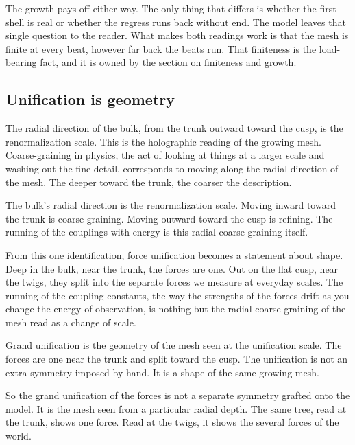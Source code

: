 The growth pays off either way. The only thing that differs is whether the first shell is real or whether the regress runs back without end. The model leaves that single question to the reader. What makes both readings work is that the mesh is finite at every beat, however far back the beats run. That finiteness is the load-bearing fact, and it is owned by the section on finiteness and growth.

\subsection{Unification is geometry}

The radial direction of the bulk, from the trunk outward toward the cusp, is the renormalization scale. This is the holographic reading of the growing mesh. Coarse-graining in physics, the act of looking at things at a larger scale and washing out the fine detail, corresponds to moving along the radial direction of the mesh. The deeper toward the trunk, the coarser the description.

\begin{principle}
The bulk's radial direction is the renormalization scale. Moving inward toward the trunk is coarse-graining. Moving outward toward the cusp is refining. The running of the couplings with energy is this radial coarse-graining itself.
\end{principle}

From this one identification, force unification becomes a statement about shape. Deep in the bulk, near the trunk, the forces are one. Out on the flat cusp, near the twigs, they split into the separate forces we measure at everyday scales. The running of the coupling constants, the way the strengths of the forces drift as you change the energy of observation, is nothing but the radial coarse-graining of the mesh read as a change of scale.

\begin{result}
Grand unification is the geometry of the mesh seen at the unification scale. The forces are one near the trunk and split toward the cusp. The unification is not an extra symmetry imposed by hand. It is a shape of the same growing mesh.
\end{result}

So the grand unification of the forces is not a separate symmetry grafted onto the model. It is the mesh seen from a particular radial depth. The same tree, read at the trunk, shows one force. Read at the twigs, it shows the several forces of the world.

